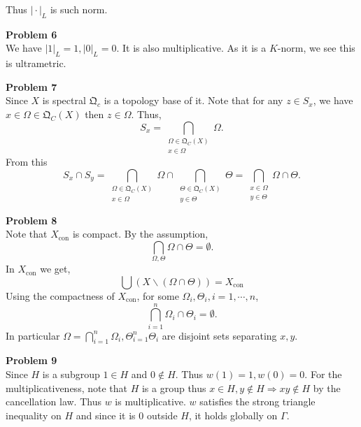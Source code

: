 \documentclass[10pt]{article}
\DeclareMathOperator{\con}{con}
\newcommand{\Qc}[0]{\mathfrak{Q}_C}
\newcommand{\ab}[1]{\vert #1 \vert}
\begin{document}
Thus $\ab{\cdot}_L$ is such norm.
\par\textbf{Problem 6}\\
We have $\ab{1}_L = 1,\ab{0}_L = 0$. It is also multiplicative. As it is a $K$-norm, we see this is ultrametric.
\par\textbf{Problem 7}\\
Since $X$ is spectral $\mathfrak{Q}_c$ is a topology base of it. Note that for any $z\in S_x$, we have $x\in\Omega\in\Qc(X)$ then $z\in\Omega$. Thus,
\begin{equation*}
    S_x = \bigcap_{\substack{\Omega\in\Qc(X)\\ x\in\Omega}}\Omega.
\end{equation*}
From this 
\begin{equation*}
    S_x\cap S_y = \bigcap_{\substack{\Omega\in\Qc(X)\\ x\in\Omega}}\Omega\cap \bigcap_{\substack{\Theta\in\Qc(X)\\ y\in\Theta}}\Theta = \bigcap_{\substack{x\in\Omega\\y\in\Theta}}\Omega\cap\Theta.
\end{equation*}
\par\textbf{Problem 8}\\
Note that $X_{\con}$ is compact. By the assumption,
\begin{equation*}
    \bigcap_{\Omega,\Theta}\Omega\cap\Theta = \emptyset.
\end{equation*}
In $X_{\con}$ we get,
\begin{equation*}
    \bigcup (X\backslash(\Omega\cap\Theta)) = X_{\con}
\end{equation*}
Using the compactness of $X_{\con}$, for some $\Omega_i,\Theta_i,i=1,\cdots,n$,
\begin{equation*}
    \bigcap_{i=1}^n \Omega_i\cap\Theta_i = \emptyset.
\end{equation*}
In particular $\Omega = \bigcap_{i=1}^n \Omega_i,\Theta_{i=1}^n\Theta_i$ are disjoint sets separating $x,y$.
\par\textbf{Problem 9}\\
Since $H$ is a subgroup $1\in H$ and $0\not\in H$. Thus $w(1) = 1,w(0) = 0$. For the multiplicativeness, note that $H$ is a group thus $ x\in H,y\not\in H\Rightarrow xy\not\in H$ by the cancellation law. Thus $w$ is multiplicative. 
$w$ satisfies the strong triangle inequality on $H$ and since it is $0$ outside $H$, it holds globally on $\Gamma$.
\end{document}
